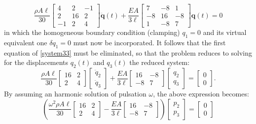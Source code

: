 \documentclass[12pt]{article}
\begin{document}
\begin{equation}\label{system33}
    \frac{\rho A \ell}{30}
    \begin{bmatrix}
        4  & 2  & -1 \\
        2  & 16 & 2  \\
        -1 & 2  & 4
    \end{bmatrix}
    \ddot{\mathbf{q}}(t) +
    \frac{E A}{3\ell}
    \begin{bmatrix}
        7  & -8 & 1  \\
        -8 & 16 & -8 \\
        1  & -8 & 7
    \end{bmatrix}
    \mathbf{q}(t) = 0
\end{equation}
in which the homogeneous boundary condition (clamping) $q_1 = 0$ and its virtual equivalent one $\delta q_1 = 0$ must now be incorporated. It follows that the first equation of \eqref{system33} must be eliminated, so that the problem reduces to solving for the displacements $q_2 (t)$ and $q_3 (t)$ the reduced system:
\begin{equation*}
    \frac{\rho A \ell}{30}
    \begin{bmatrix}
        16 & 2 \\
        2  & 4
    \end{bmatrix}
    \begin{bmatrix}
        \ddot{q}_2 \\
        \ddot{q}_3
    \end{bmatrix}
    +
    \frac{E A}{3\ell}
    \begin{bmatrix}
        16 & -8 \\
        -8 & 7
    \end{bmatrix}
    \begin{bmatrix}
        q_2 \\
        q_3
    \end{bmatrix}
    =
    \begin{bmatrix}
        0 \\
        0
    \end{bmatrix}.
\end{equation*}
By assuming an harmonic solution of pulsation $\omega$, the above expression becomes:
\begin{equation*}
    \left( \frac{\omega^2 \rho A \ell}{30}
    \begin{bmatrix}
        16 & 2 \\
        2  & 4
    \end{bmatrix}
    -
    \frac{E A}{3\ell}
    \begin{bmatrix}
        16 & -8 \\
        -8 & 7
    \end{bmatrix}
    \right)
    \begin{bmatrix}
        p_2 \\
        p_3
    \end{bmatrix}
    =
    \begin{bmatrix}
        0 \\
        0
    \end{bmatrix}
\end{equation*}
\end{document}
